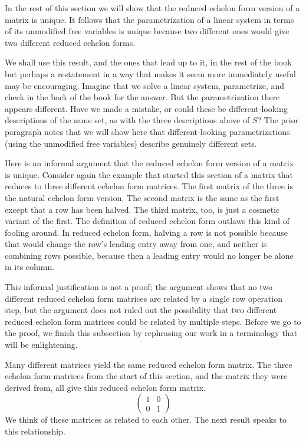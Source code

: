 In the rest 
of this section we will show that the reduced echelon form version
of a matrix is unique.
It follows that the parametrization of a linear system
in terms of its unmodified free variables is unique
because two different ones would give two different reduced echelon forms.

We shall use this result, and the ones that lead up to it, in the rest of
the book but perhaps a restatement in a way that makes it seem more 
immediately useful may be encouraging.
Imagine that we solve a linear system, parametrize, and check in the back of
the book for the answer.
But the parametrization there appears different.
Have we made a mistake, or could these be different-looking
descriptions of the same set, as with the three descriptions above of $S$?
The prior paragraph notes that
we will show here   
that different-looking parametrizations (using the unmodified free
variables) describe genuinely different sets. 

Here is an informal argument that the reduced 
echelon form version of a matrix is unique.
Consider again the example that started this section of a matrix that
reduces to three different echelon form matrices.
The first matrix of the three is the natural echelon form version.
The second matrix is the same as 
the first except that a row has been halved.
The third matrix, too, is just a cosmetic variant of the first. 
The definition of reduced echelon form outlaws this kind of fooling around.
In reduced echelon form,
halving a row is not possible because that would
change the row's leading entry away from one, and
neither is combining rows possible, because then a leading entry would no
longer be alone in its column.

This informal justification is not a proof;
the argument shows that no two different reduced echelon form matrices
are related by a single row operation step, but the argument does not
ruled out the possibility that two different reduced echelon form
matrices could be related by multiple steps.
Before we go to the proof, we finish this subsection by 
rephrasing our work in a terminology that will be enlightening.

Many different matrices yield the same reduced echelon
form matrix.
The three echelon form matrices from the start of this section, and
the matrix they were derived from, all give this reduced echelon form
matrix.
\begin{equation*}
  \begin{pmatrix}
    1  &0  \\
    0  &1
  \end{pmatrix}
\end{equation*}
We think of these matrices as related to each other.
The next result speaks to this relationship.

